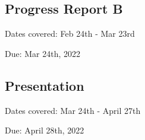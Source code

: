 \documentclass[sigplan,screen]{acmart}
\begin{document}
\subsection{Progress Report B}

Dates covered: Feb 24th - Mar 23rd

Due: Mar 24th, 2022

\subsection{Presentation}

Dates covered: Mar 24th - April 27th

Due: April 28th, 2022

\clearpage


\listoftodos{}
\end{document}
